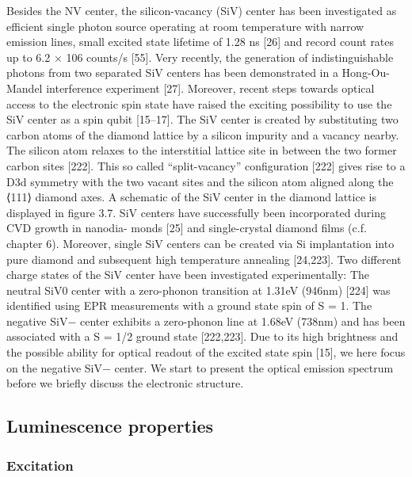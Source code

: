   Besides the NV center, the silicon-vacancy (SiV) center has been investigated as efficient single photon source operating at room temperature with narrow emission lines, small excited state lifetime of 1.28 ns [26] and record count rates up to 6.2 × 106 counts/s [55]. Very recently, the generation of indistinguishable photons from two separated SiV centers has been demonstrated in a Hong-Ou-Mandel interference experiment [27]. Moreover, recent steps towards optical access to the electronic spin state have raised the exciting possibility to use the SiV center as a spin qubit [15–17].
  The SiV center is created by substituting two carbon atoms of the diamond lattice by a silicon impurity and a vacancy nearby. The silicon atom relaxes to the interstitial lattice site in between the two former carbon sites [222]. This so called “split-vacancy” configuration [222] gives rise to a D3d symmetry with the two vacant sites and the silicon atom aligned along the ⟨111⟩ diamond axes. A schematic of the SiV center in the diamond lattice is displayed in figure 3.7.
  SiV centers have successfully been incorporated during CVD growth in nanodia- monds [25] and single-crystal diamond films (c.f. chapter 6). Moreover, single SiV centers can be created via Si implantation into pure diamond and subsequent high temperature annealing [24,223].
  Two different charge states of the SiV center have been investigated experimentally:
  The neutral SiV0 center with a zero-phonon transition at 1.31eV (946nm) [224] was identified using EPR measurements with a ground state spin of S = 1. The negative SiV− center exhibits a zero-phonon line at 1.68eV (738nm) and has been associated with a S = 1/2 ground state [222,223]. Due to its high brightness and the possible ability for optical readout of the excited state spin [15], we here focus on the negative SiV− center. We start to present the optical emission spectrum before we briefly discuss the electronic structure.


  \subsection{Luminescence properties}

    \subsubsection{Excitation}

